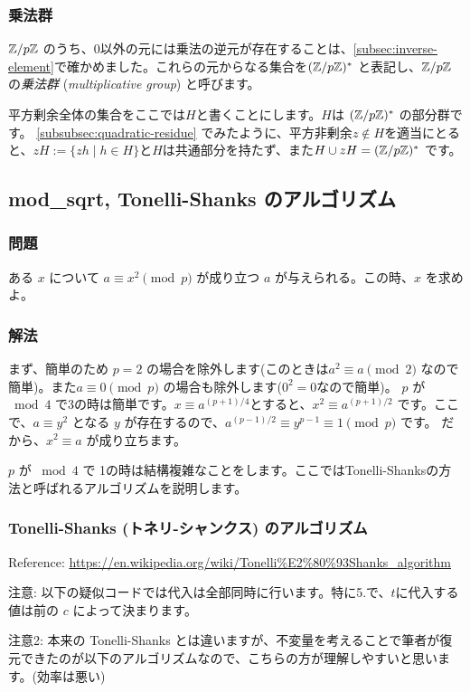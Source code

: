 \documentclass{jsarticle}
\begin{document}
   \subsubsection{乗法群}
   $\mathbb{Z}/p\mathbb{Z}$ のうち、0以外の元には乗法の逆元が存在することは、\ref{subsec:inverse-element}で確かめました。これらの元からなる集合を$(\mathbb{Z}/p\mathbb{Z})^*$ と表記し、$\mathbb{Z}/p\mathbb{Z}$の\emph{乗法群}  (\emph{multiplicative group}) と呼びます。

   平方剰余全体の集合をここでは$H$と書くことにします。$H$は $(\mathbb{Z}/p\mathbb{Z})^*$ の部分群です。
   \ref{subsubsec:quadratic-residue} でみたように、平方非剰余$z \not \in H$を適当にとると、$zH := \{zh \mid h \in H\}$と$H$は共通部分を持たず、また$H \cup zH = (\mathbb{Z}/p\mathbb{Z})^*$ です。
\subsection{mod\_sqrt, Tonelli-Shanks のアルゴリズム}
\subsubsection{問題}
ある $x$ について $a \equiv x^2 \pmod p$ が成り立つ $a$ が与えられる。この時、$x$ を求めよ。

\subsubsection{解法}
まず、簡単のため $p = 2$ の場合を除外します(このときは$a^2 \equiv a \pmod 2$ なので簡単)。また$a \equiv 0 \pmod p$ の場合も除外します($0^2 = 0$なので簡単)。
$p$ が${}\bmod 4$ で3の時は簡単です。$x \equiv a^{(p+1)/4}$とすると、$x^2 \equiv a^{(p+1)/2}$ です。ここで、$a \equiv y^2$ となる $y$ が存在するので、$a^{(p-1)/2}\equiv y^{p-1}\equiv 1 \pmod p$ です。
だから、$x^2 \equiv a$ が成り立ちます。

$p$ が ${}\bmod 4$ で 1の時は結構複雑なことをします。ここではTonelli-Shanksの方法と呼ばれるアルゴリズムを説明します。

\subsubsection{Tonelli-Shanks (トネリ-シャンクス) のアルゴリズム}
Reference: \url{https://en.wikipedia.org/wiki/Tonelli%E2%80%93Shanks_algorithm}

注意: 以下の疑似コードでは代入は全部同時に行います。特に5.で、$t$に代入する値は前の $c$ によって決まります。

注意2: 本来の Tonelli-Shanks とは違いますが、不変量を考えることで筆者が復元できたのが以下のアルゴリズムなので、こちらの方が理解しやすいと思います。(効率は悪い)
\end{document}
